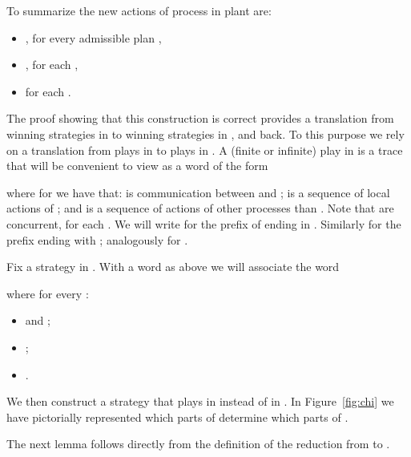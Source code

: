 \documentclass{llncs}
\begin{document}
To summarize the new actions of process  in plant  are:
\begin{itemize}
\item , for every admissible plan  ,
\item , for each ,
\item  for each
  .
\end{itemize}


The proof showing that this construction is correct provides a
translation from winning strategies in  to winning strategies in
, and back. To this purpose we rely on a
translation from plays in  to plays in . A (finite or
infinite) play  in  is a trace that will be convenient
to view as a word of the form

where for  we have that:  is communication between  and ;  is a sequence of local actions of ; and  is a sequence of actions of other processes than . Note that  are
concurrent, for each . We will write  for the prefix of
 ending in . Similarly  for the prefix ending with 
; analogously for .

Fix a strategy  in . With a word  as above we will associate the word

where for every :
\begin{itemize}
\item  and ;
\item ;
\item .
\end{itemize}
We then construct a strategy that plays  in  instead of
 in . In Figure~\ref{fig:chi} we have pictorially represented
which parts of  determine which parts of .

\begin{figure*}[tbhf]
  \centering
{}
  \caption{Definition of }
  \label{fig:chi}
\end{figure*}


The next lemma follows directly from the definition of the reduction
from  to .
\end{document}
